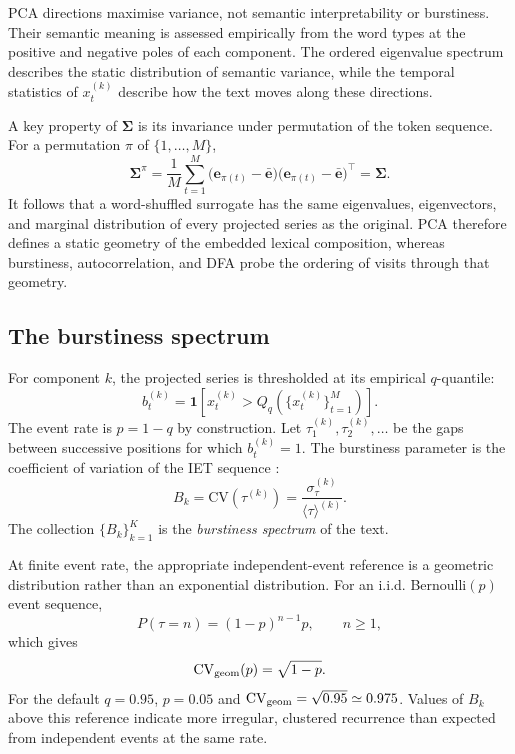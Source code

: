 \documentclass[12pt,a4paper]{article}
\newcommand{\bk}{B_k}
\newcommand{\xtk}{x_t^{(k)}}
\newcommand{\ebar}{\bar{\mathbf{e}}}
\newcommand{\Sig}{\boldsymbol{\Sigma}}
\newcommand{\meantau}{\langle\tau\rangle}
\newcommand{\sigmatau}{\sigma_\tau}
\newcommand{\CV}{\mathrm{CV}}
\begin{document}
PCA directions maximise variance, not semantic interpretability or
burstiness.
Their semantic meaning is assessed empirically from the word types at
the positive and negative poles of each component.
The ordered eigenvalue spectrum describes the static distribution of
semantic variance, while the temporal statistics of $\xtk$ describe how
the text moves along these directions.

A key property of $\Sig$ is its invariance under permutation of the
token sequence.
For a permutation $\pi$ of $\{1,\ldots,M\}$,
\begin{equation}
  \Sig^{\pi}
  =\frac{1}{M}\sum_{t=1}^M
  \bigl(\mathbf{e}_{\pi(t)}-\ebar\bigr)
  \bigl(\mathbf{e}_{\pi(t)}-\ebar\bigr)^\top
  =\Sig.
  \label{eq:sigma_invariant}
\end{equation}
It follows that a word-shuffled surrogate has the same eigenvalues,
eigenvectors, and marginal distribution of every projected series as
the original.
PCA therefore defines a static geometry of the embedded lexical
composition, whereas burstiness, autocorrelation, and DFA probe the
ordering of visits through that geometry.

\subsection{The burstiness spectrum}
\label{sec:burstiness_spectrum}

For component $k$, the projected series is thresholded at its empirical
$q$-quantile:
\begin{equation}
  b_t^{(k)}=
  \mathbf{1}\!\left[
  \xtk>Q_q\!\left(\{\xtk\}_{t=1}^M\right)
  \right].
  \label{eq:binary_k}
\end{equation}
The event rate is $p=1-q$ by construction.
Let $\tau_1^{(k)},\tau_2^{(k)},\ldots$ be the gaps between successive
positions for which $b_t^{(k)}=1$.
The burstiness parameter is the coefficient of variation of the IET
sequence \citep{GohBarabasi2008,Altmann2012}:
\begin{equation}
  \bk
  =\CV\!\left(\tau^{(k)}\right)
  =\frac{\sigmatau^{(k)}}{\meantau^{(k)}}.
  \label{eq:burstiness_def}
\end{equation}
The collection $\{\bk\}_{k=1}^K$ is the \emph{burstiness spectrum} of
the text.

At finite event rate, the appropriate independent-event reference is a
geometric distribution rather than an exponential distribution.
For an i.i.d. Bernoulli$(p)$ event sequence,
\begin{equation}
  P(\tau=n)=(1-p)^{n-1}p,
  \qquad n\geq1,
\end{equation}
which gives
\begin{equation}
  \CV_{\rm geom}(p)=\sqrt{1-p}.
  \label{eq:cv_geometric}
\end{equation}
For the default $q=0.95$, $p=0.05$ and
$\CV_{\rm geom}=\sqrt{0.95}\simeq0.975$.
Values of $B_k$ above this reference indicate more irregular,
clustered recurrence than expected from independent events at the same
rate.
\end{document}
